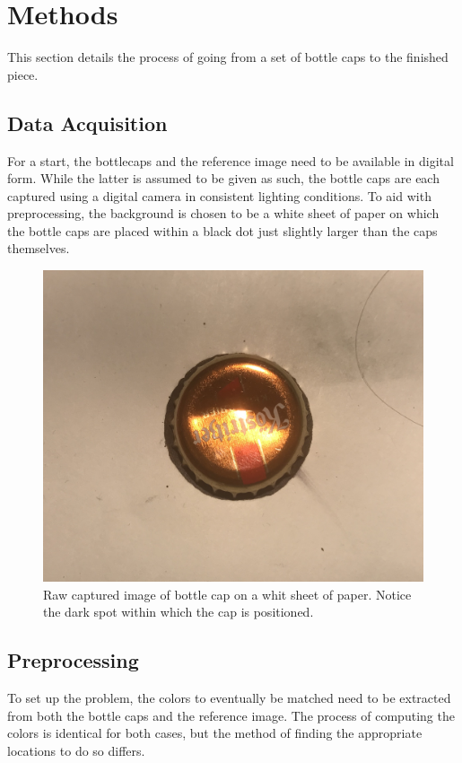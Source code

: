 \documentclass{article}
\begin{document}
\section{Methods}
This section details the process of going from a set of bottle caps to the finished piece.
\subsection{Data Acquisition}
For a start, the bottlecaps and the reference image need to be available in digital form. While the latter is assumed to be given as such, the bottle caps are each captured using a digital camera in consistent lighting conditions. To aid with preprocessing, the background is chosen to be a white sheet of paper on which the bottle caps are placed within a black dot just slightly larger than the caps themselves.  
\begin{figure}[h]
	\begin{center}
	\includegraphics[width=0.5\linewidth]{cap_raw.png}
	\caption{Raw captured image of bottle cap on a whit sheet of paper. Notice the dark spot within which the cap is positioned.}
	\label{cap:raw}
\end{center}
\end{figure}
\subsection{Preprocessing}
To set up the problem, the colors to eventually be matched need to be extracted from both the bottle caps and the reference image. The process of computing the colors is identical for both cases, but the method of finding the appropriate locations to do so differs.
\end{document}
